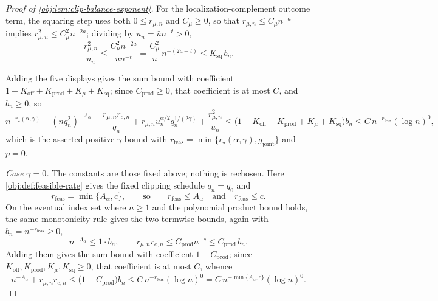 \begin{proof}[Proof of \cref{obj:lem:clip-balance-exponent}]
For the localization-complement outcome term, the squaring step uses both \(0\le r_{\mu,n}\) and \(C_\mu\ge0\), so that \(r_{\mu,n}\le C_\mu n^{-a}\) implies \(r_{\mu,n}^2\le C_\mu^2n^{-2a}\); dividing by \(u_n=\bar un^{-t}>0\),
\[
\frac{r_{\mu,n}^2}{u_n}
\le
\frac{C_\mu^2n^{-2a}}{\bar un^{-t}}
=
\frac{C_\mu^2}{\bar u}\,n^{-(2a-t)}
\le
K_{\mathrm{sq}}\,b_n .
\]

Adding the five displays gives the sum bound with coefficient \(1+K_{\mathrm{off}}+K_{\mathrm{prod}}+K_\mu+K_{\mathrm{sq}}\); since \(C_{\mathrm{prod}}\ge0\), that coefficient is at most \(C\), and \(b_n\ge0\), so
\[
n^{-r_\star(\alpha,\gamma)}+(nq_n^2)^{-A_\alpha}
+\frac{r_{\mu,n}r_{e,n}}{q_n}
+r_{\mu,n}u_n^{\alpha/2}q_n^{1/(2\gamma)}
+\frac{r_{\mu,n}^2}{u_n}
\le
\bigl(1+K_{\mathrm{off}}+K_{\mathrm{prod}}+K_\mu+K_{\mathrm{sq}}\bigr)b_n
\le
C\,n^{-r_{\mathrm{feas}}}(\log n)^0,
\]
which is the asserted positive-\(\gamma\) bound with \(r_{\mathrm{feas}}=\min\{r_\star(\alpha,\gamma),g_{\mathrm{joint}}\}\) and \(p=0\). %

\emph{Case \(\gamma=0\).}  The constants are those fixed above; nothing is rechosen.  Here \cref{obj:def:feasible-rate} gives the fixed clipping schedule \(q_n=q_0\) and
\[
r_{\mathrm{feas}}=\min\{A_\alpha,c\},
\qquad\text{so}\qquad
r_{\mathrm{feas}}\le A_\alpha
\quad\text{and}\quad
r_{\mathrm{feas}}\le c .
\]
On the eventual index set where \(n\ge1\) and the polynomial product bound holds, the same monotonicity rule gives the two termwise bounds, again with \(b_n=n^{-r_{\mathrm{feas}}}\ge0\),
\[
n^{-A_\alpha}\le 1\cdot b_n,
\qquad
r_{\mu,n}r_{e,n}\le C_{\mathrm{prod}}n^{-c}\le C_{\mathrm{prod}}\,b_n .
\]
Adding them gives the sum bound with coefficient \(1+C_{\mathrm{prod}}\); since \(K_{\mathrm{off}},K_{\mathrm{prod}},K_\mu,K_{\mathrm{sq}}\ge0\), that coefficient is at most \(C\), whence
\[
n^{-A_\alpha}+r_{\mu,n}r_{e,n}
\le
\bigl(1+C_{\mathrm{prod}}\bigr)b_n
\le
C\,n^{-r_{\mathrm{feas}}}(\log n)^0
=
C\,n^{-\min\{A_\alpha,c\}}(\log n)^0 .
\]
\end{proof}
